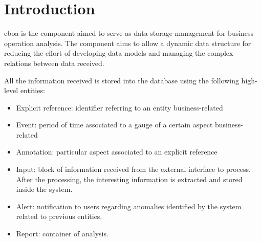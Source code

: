 \chapter{Introduction}\label{c:intro}

\acrshort{eboa} is the component aimed to serve as data storage management for business operation analysis. The component aims to allow a dynamic data structure for reducing the effort of developing data models and managing the complex relations between data received.

All the information received is stored into the database using the following high-level entities:

\begin{itemize}

\item Explicit reference: identifier referring to an entity business-related
\item Event: period of time associated to a gauge of a certain aspect business-related
\item Annotation: particular aspect associated to an explicit reference
\item Input: block of information received from the external interface to process. After the processing, the interesting information is extracted and stored inside the system.
\item Alert: notification to users regarding anomalies identified by the system related to previous entities.
\item Report: container of analysis.

\end{itemize}
